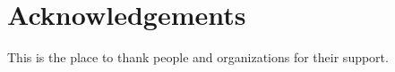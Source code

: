 \chapter{Acknowledgements} \label{acknowledgements}

This is the place to thank people and organizations for their support.